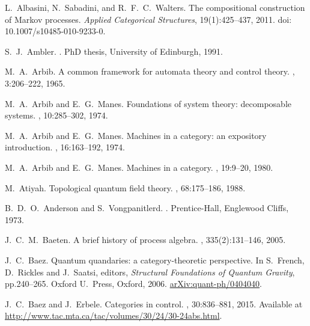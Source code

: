 \begin{thebibliography}{RSW00}
    L.\ Albasini, N.\ Sabadini, and R.\ F.\ C.\ Walters. 
    \newblock The compositional construction of Markov processes.
    \newblock \emph{Applied Categorical Structures}, { 19}(1):425--437, 2011. 
    \newblock doi: 10.1007/s10485-010-9233-0.

    S.\ J.\ Ambler. 
    . 
    \newblock PhD thesis, University of Edinburgh, 1991.

    M.\ A.\ Arbib.
    \newblock A common framework for automata theory and control theory.
    , 3:206--222, 1965. 
    
    M.\ A.\ Arbib and E.\ G.\ Manes.
    \newblock Foundations of system theory: decomposable systems. 
    , 10:285--302, 1974.

    M.\ A.\ Arbib and E.\ G.\ Manes.
    \newblock Machines in a category: an expository introduction. 
    , 16:163--192, 1974.

    M.\ A.\ Arbib and E.\ G.\ Manes. 
    \newblock Machines in a category.
    , 19:9--20, 1980.

     M.\ Atiyah. 
    \newblock Topological quantum field theory.
    , 68:175--186, 1988. 

    B.\ D.\ O.\ Anderson and S.\ Vongpanitlerd. 
    . Prentice-Hall, Englewood Cliffs, 1973.

    J.\ C.\ M.\ Baeten. 
    \newblock A brief history of process algebra.
    , 335(2):131--146, 2005.

    J.\ C.\ Baez. 
    \newblock Quantum quandaries: a category-theoretic
    perspective. 
    \newblock In S.\ French, D.\ Rickles and J.\ Saatsi, editors, {\sl Structural Foundations of Quantum Gravity}, pp.240--265. 
    \newblock Oxford U.\ Press, Oxford, 2006. 
    \newblock \href{http://arxiv.org/abs/quant-ph/0404040}
    {arXiv:quant-ph/0404040}.

    J.\ C.\ Baez and J.\ Erbele.
    \newblock Categories in control. 
    , { 30}:836--881,
    2015. 
    \newblock Available at
    \href{http://www.tac.mta.ca/tac/volumes/30/24/30-24abs.html}{http://www.tac.mta.ca/tac/volumes/30/24/30-24abs.html}.


\end{thebibliography}
